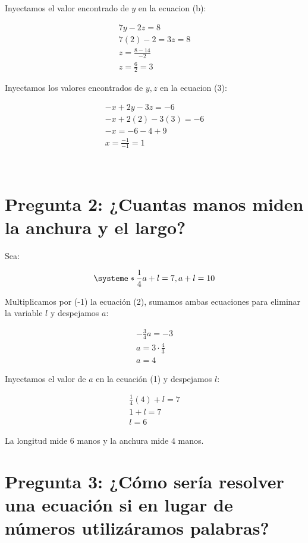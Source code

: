 \documentclass[a4paper, apacite, 12pt, doc]{apa6}
\begin{document}
Inyectamos el valor encontrado de $y$ en la ecuacion (b):

\begin{gather*}
	7y -2z = 8 \\
	7(2) -2 = 3z = 8 \\
	z = \frac{8 - 14}{-2} \\
	z = \frac{6}{2} = 3
\end{gather*}


Inyectamos los valores encontrados de $y, z$ en la ecuacion (3):

\begin{gather*}
	-x+2y-3z =-6 \\
	-x +2(2) -3(3) = -6 \\
	-x = -6 -4 +9 \\
	x = \frac{-1}{-1} = 1
\end{gather*}



\begin{gather*}
\\
\\
\end{gather*}


\section{Pregunta 2: ¿Cuantas manos miden la anchura y el largo?}

Sea:

\[
\systeme*{\frac{1}{4}a +l = 7,
a +l = 10} \]

Multiplicamos por (-1) la ecuación (2), sumamos ambas ecuaciones para eliminar la variable $l$ y despejamos $a$:

\begin{gather*}
	-\frac{3}{4}a= -3\\
	a = 3 \cdot \frac{4}{3} \\
	a = 4
\end{gather*}

Inyectamos el valor de $a$ en la ecuación (1) y despejamos $l$:

\begin{gather*}
	\frac{1}{4}(4) + l = 7 \\
	1 + l = 7 \\
	l = 6
\end{gather*}

La longitud mide 6 manos y la anchura mide 4 manos.


\section{Pregunta 3: ¿Cómo sería resolver una ecuación si en lugar de números utilizáramos palabras?}
\end{document}
